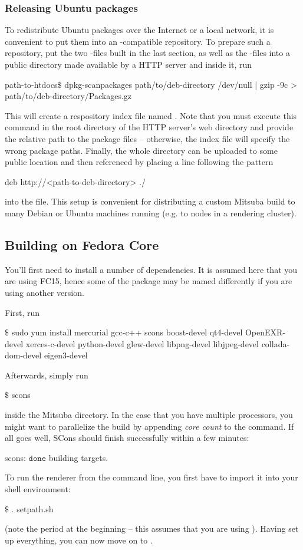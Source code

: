 \subsubsection{Releasing Ubuntu packages}
To redistribute Ubuntu packages over the Internet or a local network, it is convenient to 
put them into an -compatible repository. To prepare such a
repository, put the two -files built in the last section, 
as well as the  -files into a public directory 
made available by a HTTP server and inside it, run
\begin{shell}
path-to-htdocs$\text{\$}$ dpkg-scanpackages path/to/deb-directory /dev/null | gzip -9c > path/to/deb-directory/Packages.gz
\end{shell}
This will create a respository index file named .
Note that you must execute this command in the root directory of the
HTTP server's web directory and provide the relative path to the 
package files -- otherwise, the index file will specify the wrong package 
paths. Finally, the whole directory can be uploaded to some public location
and then referenced by placing a line following the pattern
\begin{shell}
deb http://<path-to-deb-directory> ./
\end{shell}
into the  file. This setup is convenient for
distributing a custom Mitsuba build to many Debian or Ubuntu machines running (e.g. to nodes in a rendering cluster).
\subsection{Building on Fedora Core}
You'll first need to install a number of dependencies. It is assumed here
that you are using FC15, hence some of the package may be named differently if you are 
using another version.

First, run
\begin{shell}
$\text{\$}$ sudo yum install mercurial gcc-c++ scons boost-devel qt4-devel OpenEXR-devel xerces-c-devel python-devel glew-devel libpng-devel libjpeg-devel collada-dom-devel eigen3-devel
\end{shell}
Afterwards, simply run
\begin{shell}
$\text{\$}$ scons
\end{shell}
inside the Mitsuba directory. In the case that you have multiple processors, you might want to parallelize the build by appending \emph{core count} to the command.
If all goes well, SCons should finish successfully within a few minutes:
\begin{shell}
scons: $\texttt{done}$ building targets.
\end{shell}
To run the renderer from the command line, you first have to import it into your shell environment:
\begin{shell}
$\text{\$}$ . setpath.sh
\end{shell}
(note the period at the beginning -- this assumes that you are using ).
Having set up everything, you can now move on to .
